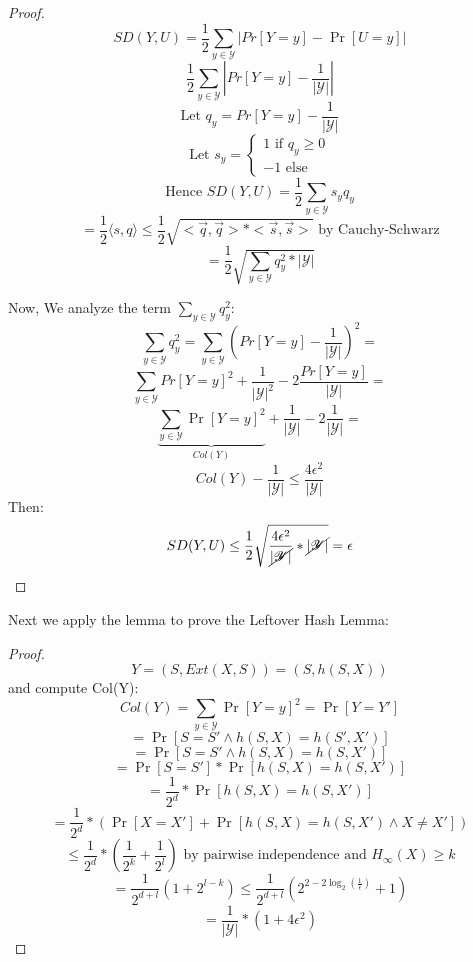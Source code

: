 \documentclass[11pt, a4paper]{article}
\begin{document}
\begin{proof}
    $$SD(Y,U) = \frac{1}{2} \sum_{y \in \mathcal{Y}} |Pr[Y=y] - \Pr[U=y]|$$
    $$\frac{1}{2} \sum_{y \in \mathcal{Y}} |Pr[Y=y] - \frac{1}{|\mathcal{Y}|}|$$
    $$\text{Let } q_y = Pr[Y=y] - \frac{1}{|\mathcal{Y}|}$$
    $$\text{Let } s_y = \begin{cases}
        1 \text{ if } q_y \geq 0\\
        -1 \text{ else}
    \end{cases}$$
    $$\text{Hence } SD(Y,U) = \frac{1}{2} \sum_{y \in \mathcal{Y}} s_y q_y$$
    $$= \frac{1}{2} \langle s,q \rangle \leq \frac{1}{2} \sqrt{<\overrightarrow{q},\overrightarrow{q}> * <\overrightarrow{s},\overrightarrow{s}>} \text{ by Cauchy-Schwarz}$$
    $$ = \frac{1}{2} \sqrt{\sum_{y \in \mathcal{Y}} q_y^2 * |\mathcal{Y}|}$$

Now, We analyze the term $\sum_{y \in \mathcal{Y}} q_y^2$:
$$\sum_{y \in \mathcal{Y}} q_y^2 = \sum_{y \in \mathcal{Y}} (Pr[Y=y] - \frac{1}{|\mathcal{Y}|})^2 =$$
$$\sum_{y \in \mathcal{Y}} Pr[Y=y]^2 + \frac{1}{|\mathcal{Y}|^2} -2\frac{Pr[Y=y]}{|\mathcal{Y}|} =$$
$$ \underbrace{\sum_{y \in \mathcal{Y}} \Pr[Y=y]^2}_{Col(Y)} + \frac{1}{|\mathcal{Y}|} - 2\frac{1}{|\mathcal{Y}|} =$$
$$Col(Y) - \frac{1}{|\mathcal{Y}|} \leq \frac{4\epsilon^2}{|\mathcal{Y}|}$$
Then:
$$SD(Y,U) \leq \frac{1}{2} \sqrt{\frac{4\epsilon^2}{\cancel{|\mathcal{Y}|}} * \cancel{|\mathcal{Y}|}} = \epsilon$$
\end{proof}
Next we apply the lemma to prove the Leftover Hash Lemma:
\begin{proof}
    $$Y = (S,Ext(X,S)) = (S,h(S,X))$$
and compute Col(Y):
$$Col(Y) = \sum_{y \in \mathcal{Y}}\Pr[Y=y]^2 = \Pr[Y=Y']$$
$$= \Pr[S=S' \wedge h(S,X) = h(S',X')]$$
$$= \Pr[S=S' \wedge h(S,X) = h(S,X')]$$
$$= \Pr[S=S'] * \Pr[h(S,X) = h(S,X')]$$
$$= \frac{1}{2^d} * \Pr[h(S,X) = h(S,X')]$$
$$ = \frac{1}{2^d} * (\Pr[X=X'] + \Pr[h(S,X) = h(S,X') \wedge X \neq X'])$$
$$ \leq \frac{1}{2^d} * (\frac{1}{2^k} + \frac{1}{2^l}) \text{ by pairwise independence and } H_\infty(X) \geq k$$
$$ = \frac{1}{2^{d+l}}(1 + 2^{l-k}) \leq \frac{1}{2^{d+l}}(2^{2-2\log_2(\frac{1}{\epsilon})}+ 1)$$
$$ = \frac{1}{|\mathcal{Y}|} * (1 + 4\epsilon^2)$$ 
\end{proof}
\end{document}

